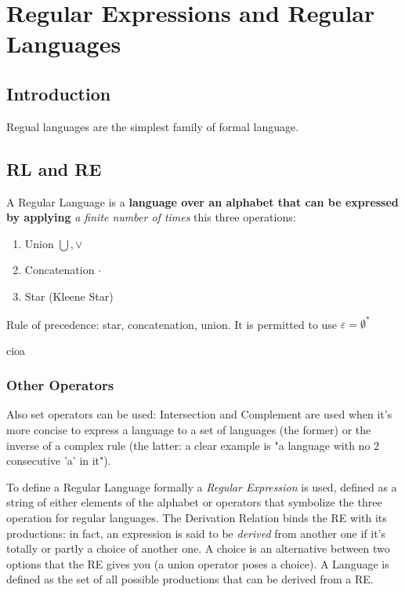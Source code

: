 \chapter{Regular Expressions and Regular Languages}
    \section{Introduction}
        Regual languages are the simplest family of formal language.
    \section{RL and RE}
    A Regular Language is a \textbf{language over an alphabet that can be expressed by applying} \emph{a finite number of times} this three operations:
        \begin{enumerate}
            \item Union $\bigcup, \vee$
            \item Concatenation $\cdot$
            \item Star (Kleene Star)
        \end{enumerate}
        Rule of precedence: star, concatenation, union.
        It is permitted to use $\varepsilon = \emptyset^* $
        
        \begin{RegularLanguage}
            cioa
        \end{RegularLanguage}


        \subsection{Other Operators}
            Also set operators can be used: Intersection and Complement are used when it's more concise to express a language to a set of languages (the former) or the inverse of a complex rule (the latter: a clear example is "a language with no 2 consecutive 'a' in it").
        
        To define a Regular Language formally a \emph{Regular Expression} is used, defined as a string of either elements of the alphabet or operators that symbolize the three operation for regular languages.
        The Derivation Relation binds the RE with its productions: in fact, an expression is said to be \emph{derived} from another one if it's totally or partly a choice of another one. A choice is an alternative between two options that the RE gives you (a union operator poses a choice). A Language is defined as the set of all possible productions that can be derived from a RE.

